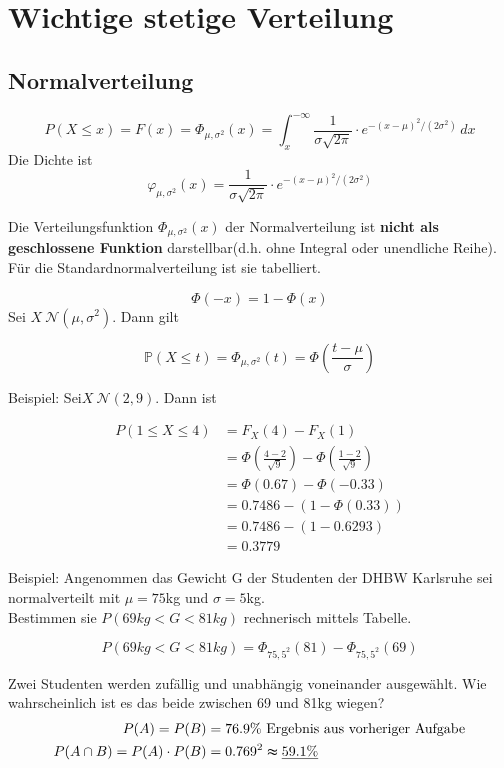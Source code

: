 \section{Wichtige stetige Verteilung}

\subsection{Normalverteilung}

\[P(X\leq x)= F(x)=\Phi_{\mu ,\sigma ^2}(x)=\int_{x}^{-\infty} \frac{1}{\sigma\sqrt{2\pi}}\cdot e^{-(x-\mu)^2/(2\sigma^2)} \,dx \]
Die Dichte ist
\[\varphi_{\mu,\sigma^2}(x)=\frac{1}{\sigma\sqrt{2\pi}}\cdot e^{-(x-\mu)^2/(2\sigma^2)}\]

Die Verteilungsfunktion $\Phi_{\mu ,\sigma ^2}(x)$ der Normalverteilung ist \textbf{nicht als geschlossene Funktion} darstellbar(d.h. ohne Integral oder unendliche Reihe). Für die Standardnormalverteilung ist sie tabelliert.

\[\Phi(-x)=1-\Phi(x)\]
Sei $X~\mathcal{N} (\mu,\sigma^2)$. Dann gilt

\[\mathbb{P} (X\leq t)=\Phi_{\mu ,\sigma ^2}(t)=\Phi\left( \frac{t-\mu}{\sigma} \right)\]

Beispiel: Sei$X~\mathcal{N} (2,9)$. Dann ist

\begin{align}
    P(1\leq X\leq 4)&=F_X(4)-F_X(1)\\
    &=\Phi\left(\frac{4-2}{\sqrt{9}}\right)-\Phi\left(\frac{1-2}{\sqrt{9} } \right)\\
    &=\Phi(0.67)-\Phi(-0.33)\\
    &=0.7486-(1-\Phi(0.33))\\
    &=0.7486-(1-0.6293)\\
    &=0.3779
\end{align}

Beispiel: Angenommen das Gewicht G der Studenten der DHBW Karlsruhe sei normalverteilt mit $\mu =75$kg und $\sigma=5$kg.\\

Bestimmen sie $P(69kg<G<81kg)$ rechnerisch mittels Tabelle.

\[P(69kg<G<81kg)=\Phi_{75,5^2}(81)-\Phi_{75,5^2}(69)\]

Zwei Studenten werden zufällig und unabhängig voneinander ausgewählt. Wie wahrscheinlich ist es das beide zwischen 69 und 81kg wiegen?
\begin{align}
    P(A)=P(B)&=76.9\%\textrm{ Ergebnis aus vorheriger Aufgabe}\\
    P(A\cap B)=P(A)\cdot P(B)&=0.769^2\thickapprox \underline{59.1\% }
\end{align}

